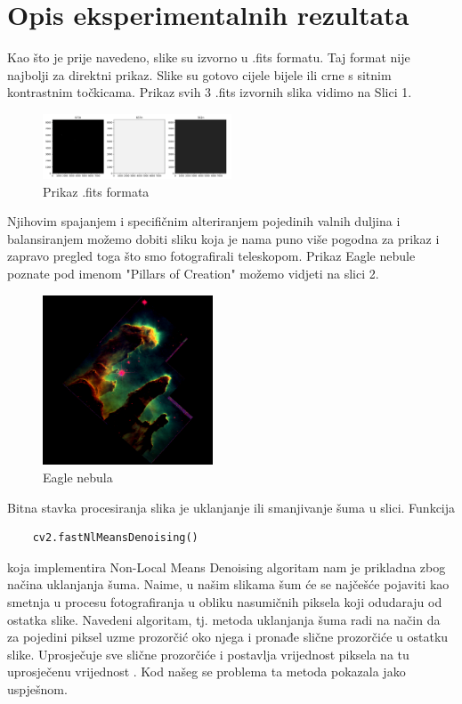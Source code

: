 \documentclass[conference]{IEEEtran}
\begin{document}
\section{Opis eksperimentalnih rezultata}

Kao što je prije navedeno, slike su izvorno u .fits formatu. Taj format nije najbolji za direktni prikaz. Slike su gotovo cijele bijele ili crne s sitnim kontrastnim točkicama. Prikaz svih 3 .fits izvornih slika vidimo na Slici 1.
\begin{figure}[h]
    \centering
    \includegraphics[width=0.5\textwidth]{specks}
    \caption{Prikaz .fits formata}
    \label{slika:s1}
\end{figure}

Njihovim spajanjem i specifičnim alteriranjem pojedinih valnih duljina i balansiranjem možemo dobiti sliku koja je nama puno više pogodna za prikaz i zapravo pregled toga što smo fotografirali teleskopom. Prikaz Eagle nebule poznate pod imenom "Pillars of Creation" možemo vidjeti na slici 2.
\begin{figure}[h]
    \centering
    \includegraphics[width=0.45\textwidth]{pillar}
    \caption{Eagle nebula}
    \label{slika:s2}
\end{figure}

Bitna stavka procesiranja slika je uklanjanje ili smanjivanje šuma u slici. Funkcija 
\begin{verbatim}
    cv2.fastNlMeansDenoising()
\end{verbatim}
koja implementira Non-Local Means Denoising algoritam nam je prikladna zbog načina uklanjanja šuma. Naime, u našim slikama šum će se najčešće pojaviti kao smetnja u procesu fotografiranja u obliku nasumičnih piksela koji odudaraju od ostatka slike. Navedeni algoritam, tj. metoda uklanjanja šuma radi na način da za pojedini piksel uzme prozorčić oko njega i pronađe slične prozorčiće u ostatku slike. Uprosječuje sve slične prozorčiće i postavlja vrijednost piksela na tu uprosječenu vrijednost \cite{fastNlMeansDenoising}. Kod našeg se problema ta metoda pokazala jako uspješnom.
\end{document}
